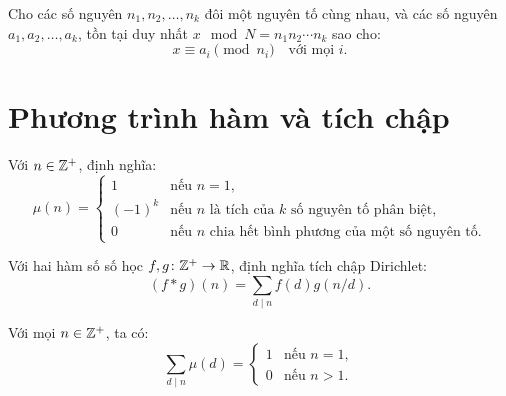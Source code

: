 \documentclass[../imo-training-open-book.tex]{subfiles}
\begin{document}
\vspace{1em}

\begin{theorem*}
    \label{theorem:chinese-remainder-theorem}
    Cho các số nguyên \( n_1, n_2, \dots, n_k \) đôi một nguyên tố cùng nhau, và các số nguyên \( a_1, a_2, \dots, a_k \), tồn tại duy nhất \( x \mod N = n_1 n_2 \cdots n_k \) sao cho:
    \[
        x \equiv a_i \pmod{n_i} \quad \text{với mọi } i.
    \]
\end{theorem*}

\newpage

\section{Phương trình hàm và tích chập}

\begin{definition*}
    \label{definition:mobius-function}
    Với \( n \in \mathbb Z^+ \), định nghĩa:
    \[
        \mu(n) =
        \begin{cases}
            1 & \text{nếu } n = 1, \\
            (-1)^k & \text{nếu } n \text{ là tích của } k \text{ số nguyên tố phân biệt}, \\
            0 & \text{nếu } n \text{ chia hết bình phương của một số nguyên tố}.
        \end{cases}
    \]
\end{definition*}

\vspace{1em}

\begin{definition*}
    \label{definition:dirichlet-convolution}
    Với hai hàm số số học \( f, g \colon \mathbb Z^+ \to \mathbb R \), định nghĩa tích chập Dirichlet:
    \[
        (f * g)(n) = \sum_{d \mid n} f(d) g(n/d).
    \]
\end{definition*}

\vspace{1em}

\begin{theorem*}
    \label{theorem:sum-mu-divisors}
    Với mọi \( n \in \mathbb Z^+ \), ta có:
    \[
        \sum_{d \mid n} \mu(d) =
        \begin{cases}
            1 & \text{nếu } n = 1, \\
            0 & \text{nếu } n > 1.
        \end{cases}
    \]
\end{theorem*}
\end{document}
